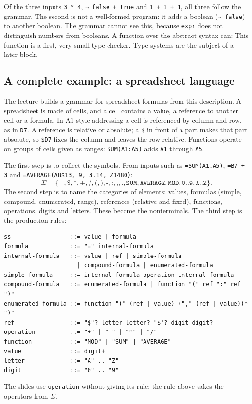 Of the three inputs \texttt{3 * 4}, \texttt{¬ false + true} and
\texttt{1 + 1 + 1}, all three follow the grammar. The second is not a
well-formed program: it adds a boolean (\texttt{¬ false}) to another boolean.
The grammar cannot see this, because \texttt{expr} does not distinguish
numbers from booleans. A function over the abstract syntax can:
This function is a first, very small type checker. Type systems are the
subject of a later block.

\subsection{A complete example: a spreadsheet language}
\label{sec:spreadsheet}

The lecture builds a grammar for spreadsheet formulas from this description.
A spreadsheet is made of cells, and a cell contains a value, a reference to
another cell or a formula. In A1-style addressing a cell is referenced by
column and row, as in \texttt{D7}. A reference is relative or absolute; a
\texttt{\$} in front of a part makes that part absolute, so \texttt{\$D7} fixes
the column and leaves the row relative. Functions operate on groups of cells
given as ranges: \texttt{SUM(A1:A5)} adds \texttt{A1} through \texttt{A5}.

The first step is to collect the symbols. From inputs such as
\texttt{=SUM(A1:A5)}, \texttt{=B7 + 3} and \texttt{=AVERAGE(AB\$13, 9, 3.14, Z1480)}:
\[
\Sigma = \{\texttt{=}, \texttt{\$}, \texttt{*}, \texttt{+}, \texttt{/}, \texttt{(}, \texttt{)},
  \texttt{-}, \texttt{:}, \texttt{,}, \texttt{.}, \texttt{SUM}, \texttt{AVERAGE}, \texttt{MOD},
  \texttt{0} .. \texttt{9}, \texttt{A} .. \texttt{Z}\}.
\]
The second step is to name the categories of elements: values, formulas
(simple, compound, enumerated, range), references (relative and fixed),
functions, operations, digits and letters. These become the nonterminals. The
third step is the production rules:
\begin{lstlisting}
ss                 ::= value | formula
formula            ::= "=" internal-formula
internal-formula   ::= value | ref | simple-formula
                     | compound-formula | enumerated-formula
simple-formula     ::= internal-formula operation internal-formula
compound-formula   ::= enumerated-formula | function "(" ref ":" ref ")"
enumerated-formula ::= function "(" (ref | value) ("," (ref | value))* ")"
ref                ::= "$"? letter letter? "$"? digit digit?
operation          ::= "+" | "-" | "*" | "/"
function           ::= "MOD" | "SUM" | "AVERAGE"
value              ::= digit+
letter             ::= "A" .. "Z"
digit              ::= "0" .. "9"
\end{lstlisting}
The slides use \texttt{operation} without giving its rule; the rule above
takes the operators from $\Sigma$.

